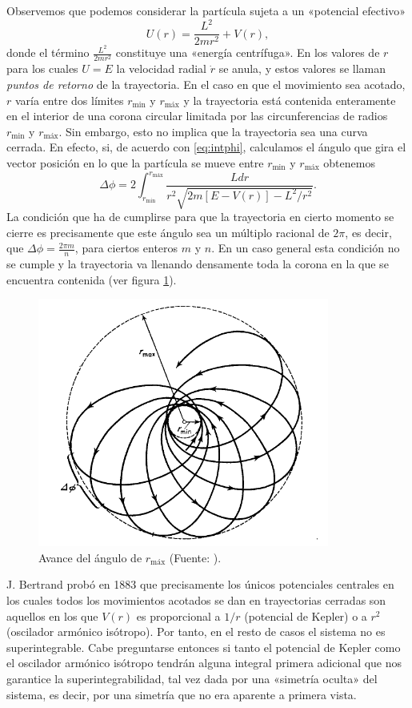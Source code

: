 \documentclass[11pt,a4paper,twoside]{article}
\theoremstyle{definition} \newtheorem{defn}[thm]{Definición}
\theoremstyle{definition} \newtheorem{ejemplo}[thm]{Ejemplo}
\theoremstyle{definition} \newtheorem{ejercicio}[thm]{Ejercicio}
\theoremstyle{remark} \newtheorem*{obs}{Observación}
\begin{document}
Observemos que podemos considerar la partícula sujeta a un «potencial efectivo»
\begin{equation}
  U(r)=\frac{L^2}{2mr^2}+V(r),
\end{equation}
donde el término $\frac{L^2}{2mr^2}$ constituye una «energía centrífuga». En los valores de $r$ para los cuales $U=E$ la velocidad radial $\dot r$ se anula, y estos valores se llaman \emph{puntos de retorno} de la trayectoria. En el caso en que el movimiento sea acotado, $r$ varía entre dos límites $r_{\text{min}}$ y $r_{\text{máx}}$ y la trayectoria está contenida enteramente en el interior de una corona circular limitada por las circunferencias de radios $r_{\text{min}}$ y $r_{\text{máx}}$. Sin embargo, esto no implica que la trayectoria sea una curva cerrada. En efecto, si, de acuerdo con \eqref{eq:intphi}, calculamos el ángulo que gira el vector posición en lo que la partícula se mueve entre $r_{\text{min}}$ y $r_{\text{máx}}$ obtenemos
\begin{equation}
  \Delta \phi = 2\int_{r_{\text{min}}}^{r_{\text{máx}}} \frac{Ldr}{r^2\sqrt{2m[E-V(r)]-L^2/r^2}}.
\end{equation}
La condición que ha de cumplirse para que la trayectoria en cierto momento se cierre es precisamente que este ángulo sea un múltiplo racional de $2\pi$, es decir, que $\Delta \phi = \frac{2\pi m}{n}$, para ciertos enteros $m$ y $n$. En un caso general esta condición no se cumple y la trayectoria va llenando densamente toda la corona en la que se encuentra contenida (ver figura \ref{fig:bertrand}).

\begin{figure}[h!]
  \centering
  \includegraphics[width=.3\textwidth]{bertrand}
  \caption{\small Avance del ángulo de $r_{\text{máx}}$ (Fuente: \cite{landau}).}
  \label{fig:bertrand}
\end{figure}


J. Bertrand probó en 1883 \cite{bertrand} que precisamente los únicos potenciales centrales en los cuales todos los movimientos acotados se dan en trayectorias cerradas son aquellos en los que $V(r)$ es proporcional a $1/r$ (potencial de Kepler) o a $r^2$ (oscilador armónico isótropo). Por tanto, en el resto de casos el sistema no es superintegrable. Cabe preguntarse entonces si tanto el potencial de Kepler como el oscilador armónico isótropo tendrán alguna integral primera adicional que nos garantice la superintegrabilidad, tal vez dada por una «simetría oculta» del sistema, es decir, por una simetría que no era aparente a primera vista.
\end{document}
